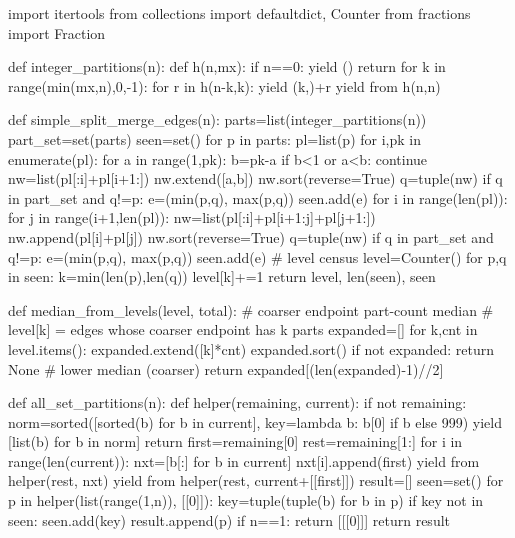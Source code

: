 import itertools
from collections import defaultdict, Counter
from fractions import Fraction

def integer_partitions(n):
    def h(n,mx):
        if n==0:
            yield ()
            return
        for k in range(min(mx,n),0,-1):
            for r in h(n-k,k):
                yield (k,)+r
    yield from h(n,n)

def simple_split_merge_edges(n):
    parts=list(integer_partitions(n))
    part_set=set(parts)
    seen=set()
    for p in parts:
        pl=list(p)
        for i,pk in enumerate(pl):
            for a in range(1,pk):
                b=pk-a
                if b<1 or a<b:
                    continue
                nw=list(pl[:i]+pl[i+1:])
                nw.extend([a,b])
                nw.sort(reverse=True)
                q=tuple(nw)
                if q in part_set and q!=p:
                    e=(min(p,q), max(p,q))
                    seen.add(e)
        for i in range(len(pl)):
            for j in range(i+1,len(pl)):
                nw=list(pl[:i]+pl[i+1:j]+pl[j+1:])
                nw.append(pl[i]+pl[j])
                nw.sort(reverse=True)
                q=tuple(nw)
                if q in part_set and q!=p:
                    e=(min(p,q), max(p,q))
                    seen.add(e)
    # level census
    level=Counter()
    for p,q in seen:
        k=min(len(p),len(q))
        level[k]+=1
    return level, len(seen), seen

def median_from_levels(level, total):
    # coarser endpoint part-count median
    # level[k] = edges whose coarser endpoint has k parts
    expanded=[]
    for k,cnt in level.items():
        expanded.extend([k]*cnt)
    expanded.sort()
    if not expanded:
        return None
    # lower median (coarser)
    return expanded[(len(expanded)-1)//2]

def all_set_partitions(n):
    def helper(remaining, current):
        if not remaining:
            norm=sorted([sorted(b) for b in current], key=lambda b: b[0] if b else 999)
            yield [list(b) for b in norm]
            return
        first=remaining[0]
        rest=remaining[1:]
        for i in range(len(current)):
            nxt=[b[:] for b in current]
            nxt[i].append(first)
            yield from helper(rest, nxt)
        yield from helper(rest, current+[[first]])
    result=[]
    seen=set()
    for p in helper(list(range(1,n)), [[0]]):
        key=tuple(tuple(b) for b in p)
        if key not in seen:
            seen.add(key)
            result.append(p)
    if n==1:
        return [[[0]]]
    return result

